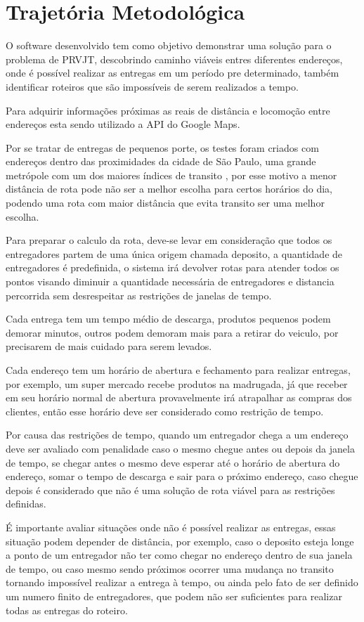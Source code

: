 \chapter{Trajetória Metodológica}
O software desenvolvido tem como objetivo demonstrar uma solução para o problema de PRVJT, descobrindo caminho viáveis entres diferentes endereços, onde é possível realizar as entregas em um período pre determinado, também identificar roteiros que são impossíveis de serem realizados a tempo. 

Para adquirir informações próximas as reais de distância e locomoção entre endereços esta sendo utilizado a API do Google Maps\cite{GoogleMatrix}.

Por se tratar de entregas de pequenos porte, os testes foram criados com endereços dentro das proximidades da cidade de São Paulo, uma grande metrópole com um dos maiores índices de transito \cite{TomTom}, por esse motivo a menor distância de rota pode não ser a melhor escolha para certos horários do dia, podendo uma rota com maior distância que evita transito ser uma melhor escolha.

Para preparar o calculo da rota, deve-se levar em consideração que todos os entregadores partem de uma única origem chamada deposito, a quantidade de entregadores é predefinida, o sistema irá devolver rotas para atender todos os pontos visando diminuir a quantidade necessária de entregadores e distancia percorrida sem desrespeitar as restrições de janelas de tempo.

Cada entrega tem um tempo médio de descarga, produtos pequenos podem demorar minutos, outros podem demoram mais para a retirar do veiculo, por precisarem de mais cuidado para serem levados.

Cada endereço tem um horário de abertura e fechamento para realizar entregas, por exemplo, um super mercado recebe produtos na madrugada, já que receber em seu horário normal de abertura provavelmente irá atrapalhar as compras dos clientes, então esse horário deve ser considerado como restrição de tempo.

Por causa das restrições de tempo, quando um entregador chega a um endereço deve ser avaliado com penalidade caso o mesmo chegue antes ou depois da janela de tempo, se chegar antes o mesmo deve esperar até o horário de abertura do endereço, somar o tempo de descarga e sair para o próximo endereço,  caso chegue depois é considerado que não é uma solução de rota viável para as restrições definidas. 

É importante avaliar situações onde não é possível realizar as entregas, essas situação podem depender de distância, por exemplo, caso o deposito esteja longe a ponto de um entregador não ter como chegar no endereço dentro de sua janela de tempo, ou caso mesmo sendo próximos ocorrer uma mudança no transito tornando impossível realizar a entrega à tempo, ou ainda pelo fato de ser definido um numero finito de entregadores, que podem não ser suficientes para realizar todas as entregas do roteiro.

